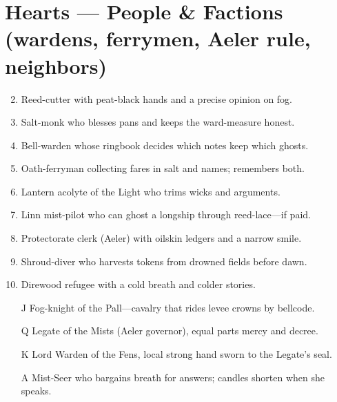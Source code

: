 \section*{Hearts --- People \& Factions (wardens, ferrymen, Aeler rule, neighbors)}
\label{sec:mistlands-people}
\begin{enumerate}
\setcounter{enumi}{1}
\item Reed-cutter with peat-black hands and a precise opinion on fog.
\item Salt-monk who blesses pans and keeps the ward-measure honest.
\item Bell-warden whose ringbook decides which notes keep which ghosts.
\item Oath-ferryman collecting fares in salt and names; remembers both.
\item Lantern acolyte of the Light who trims wicks and arguments.
\item Linn mist-pilot who can ghost a longship through reed-lace---if paid.
\item Protectorate clerk (Aeler) with oilskin ledgers and a narrow smile.
\item Shroud-diver who harvests tokens from drowned fields before dawn.
\item Direwood refugee with a cold breath and colder stories.
\item[J] Fog-knight of the Pall---cavalry that rides levee crowns by bellcode.
\item[Q] Legate of the Mists (Aeler governor), equal parts mercy and decree.
\item[K] Lord Warden of the Fens, local strong hand sworn to the Legate's seal.
\item[A] Mist-Seer who bargains breath for answers; candles shorten when she speaks.
\end{enumerate}

